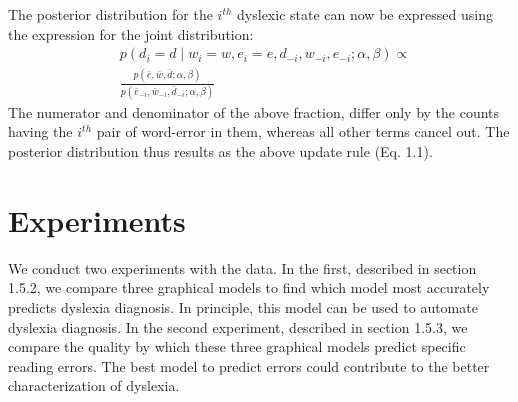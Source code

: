 The posterior distribution for the $i^{th}$ dyslexic state can now be expressed using the expression for the joint distribution:
\begin{equation*}
\begin{split}
&p(d_i=d\mid w_i=w, e_i=e, d_{-i}, w_{-i}, e_{-i}; \alpha, \beta) \propto \\
&\frac{p(\bar{e},\bar{w},\bar{d};\alpha,\beta)}{p(\bar{e}_{-i},\bar{w}_{-i},\bar{d}_{-i};\alpha,\beta)}
\end{split}
\end{equation*}
The numerator and denominator of the above fraction, differ only by the counts having the $i^{th}$ pair of word-error in them, whereas all other terms cancel out. The posterior distribution thus results as the above update rule (Eq. 1.1).

\section{Experiments}
We conduct two experiments with the data. In the first, described in section 1.5.2, we compare three graphical models to find which model most accurately predicts dyslexia diagnosis. In principle, this model can be used to automate dyslexia diagnosis. In the second experiment, described in section 1.5.3, we compare the quality by which these three graphical models predict specific reading errors. The best model to predict errors could contribute to the better characterization of dyslexia.

